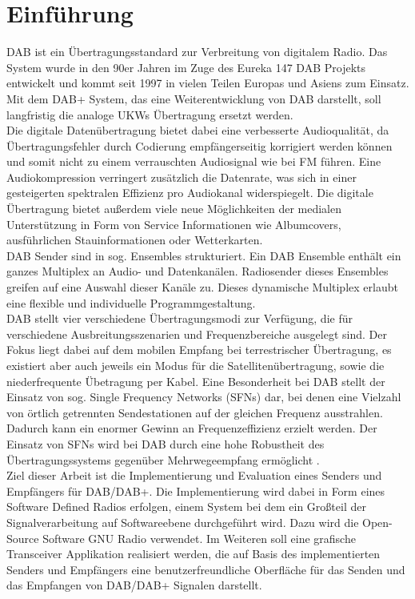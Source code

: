 \chapter{Einführung}
\label{sec:intro}
\ac{DAB} ist ein Übertragungsstandard zur Verbreitung von digitalem Radio. Das System wurde in den 90er Jahren im Zuge des Eureka 147 DAB Projekts entwickelt und kommt seit 1997 in vielen Teilen Europas und Asiens zum Einsatz. Mit dem DAB+ System, das eine Weiterentwicklung von DAB darstellt, soll langfristig die analoge \acp{UKW} Übertragung ersetzt werden.\\
Die digitale Datenübertragung bietet dabei eine verbesserte Audioqualität, da Übertragungsfehler durch Codierung empfängerseitig korrigiert werden können und somit nicht zu einem verrauschten Audiosignal wie bei FM führen. Eine Audiokompression verringert zusätzlich die Datenrate, was sich in einer gesteigerten spektralen Effizienz pro Audiokanal widerspiegelt. Die digitale Übertragung bietet außerdem viele neue Möglichkeiten der medialen Unterstützung in Form von Service Informationen wie Albumcovers, ausführlichen Stauinformationen oder Wetterkarten.\\
DAB Sender sind in sog. Ensembles strukturiert. Ein DAB Ensemble enthält ein ganzes Multiplex an Audio- und Datenkanälen. Radiosender dieses Ensembles greifen auf eine Auswahl dieser Kanäle zu. Dieses dynamische Multiplex erlaubt eine flexible und individuelle Programmgestaltung. \\
DAB stellt vier verschiedene Übertragungsmodi zur Verfügung, die für verschiedene Ausbreitungsszenarien und Frequenzbereiche ausgelegt sind. Der Fokus liegt dabei auf dem mobilen Empfang bei terrestrischer Übertragung, es existiert aber auch jeweils ein Modus für die Satellitenübertragung, sowie die niederfrequente Übetragung per Kabel. Eine Besonderheit bei DAB stellt der Einsatz von sog. Single Frequency Networks (SFNs) dar, bei denen eine Vielzahl von örtlich getrennten Sendestationen auf der gleichen Frequenz ausstrahlen. Dadurch kann ein enormer Gewinn an Frequenzeffizienz erzielt werden. Der Einsatz von SFNs wird bei DAB durch eine hohe Robustheit des Übertragungssystems gegenüber Mehrwegeempfang ermöglicht \cite{dab_buch}.\\
Ziel dieser Arbeit ist die Implementierung und Evaluation eines Senders und Empfängers für DAB/DAB+. Die Implementierung wird dabei in Form eines Software Defined Radios erfolgen, einem System bei dem ein Großteil der Signalverarbeitung auf Softwareebene durchgeführt wird. Dazu wird die Open-Source Software GNU Radio verwendet. Im Weiteren soll eine grafische Transceiver Applikation realisiert werden, die auf Basis des implementierten Senders und Empfängers eine benutzerfreundliche Oberfläche für das Senden und das Empfangen von DAB/DAB+ Signalen darstellt.

